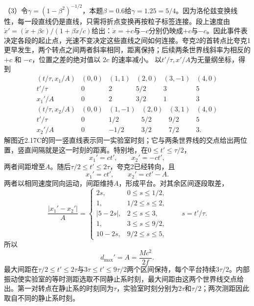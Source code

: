 \documentclass[UTF8,fontset=fandol,a4paper,11pt]{ctexart}
\newcommand{\figcaption}[1]{\par\vspace{2pt}{\small\color{muted}#1}\par}
\begin{document}
\begin{center}
\begin{minipage}{.98\linewidth}
\figcaption{解图近2.17B\quad 双夸克标签保持不变，两相图从相反动量出发。}
\end{minipage}\end{center}
（3）令$\gamma=(1-\beta^2)^{-1/2}$，本题$\beta=0.6$给$\gamma=1.25=5/4$。因为洛伦兹变换线性，每一段直线仍是直线，只需将折点变换再按粒子标签连接。段上速度由$\dot x'=(\dot x+\beta c)/(1+\beta\dot x/c)$给出：$\dot x=+c$与$-c$分别仍映成$+c$与$-c$。因此事件表决定各段的起止点，光速不变决定这些直线之间如何连接。夸克2的首转点比夸克1更早发生，两个转点之间两者斜率相同，距离保持；后续两条世界线斜率为相反的 $+c$ 和 $-c$，位置之差的绝对值以 $2c$ 的速率减小。
以$t'/\tau,x'/A$为无量纲坐标，得到
\[
\begin{array}{c|ccccc}
(t/\tau,x_1/A)&(0,0)&(1,1)&(2,0)&(3,-1)&(4,0)\\ \hline
t'/\tau&0&2&5/2&3&5\\
x_1'/A&0&2&3/2&1&3
\end{array}
\]
\[
\begin{array}{c|ccccc}
(t/\tau,x_2/A)&(0,0)&(1,-1)&(2,0)&(3,1)&(4,0)\\ \hline
t'/\tau&0&1/2&5/2&9/2&5\\
x_2'/A&0&-1/2&3/2&7/2&3 .
\end{array}
\]
解图近2.17C的同一竖直线表示同一实验室时刻；它与两条世界线的交点给出两位置，竖直间隔就是这一时刻的距离。特别地，在$0\le t'\le\tau/2$，
\[
x_1'=ct',\qquad x_2'=-ct',
\]
两者间距增至$A$。随后$\tau/2\le t'\le2\tau$，夸克2已经转向，且
\[
x_1'=ct',\qquad x_2'=ct'-A.
\]
两者以相同速度同向运动，间距维持$A$，形成平台。对其余区间逐段取差，
\[
\frac{|x_1'-x_2'|}{A}=
\begin{cases}
2s,&0\le s\le1/2,\\
1,&1/2\le s\le2,\\
|5-2s|,&2\le s\le3,\\
1,&3\le s\le9/2,\\
10-2s,&9/2\le s\le5,
\end{cases}\qquad s=t'/\tau.
\]
所以
\[
\boxed{d_{\max}'=A=\frac{Mc^2}{2f}}.
\]
最大间距在$\tau/2\le t'\le2\tau$与$3\tau\le t'\le9\tau/2$两个区间保持，每个平台持续$3\tau/2$。内部振动使实验室的等时测距选取不同静止系时刻，最大间距由这两个世界线交点给出。第一对转点在静止系的时刻同为$\tau$，实验室时刻分别为$2\tau$和$\tau/2$；两次测距因此取自不同的静止系时刻。
\end{document}
